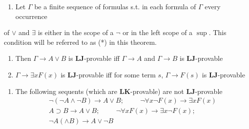 \documentclass[11pt]{article}
\def \LJ {\textbf{LJ}}
\def \LK {\textbf{LK}}
\begin{document}
\begin{theorem}[Harrop]
\label{orgf48515c}
\begin{enumerate}
\item Let \(\Gamma\) be a finite sequence of formulas s.t. in each formula of \(\Gamma\) every occurrence
\end{enumerate}
of \(\vee\) and \(\exists\) is either in the scope of a \(\neg\) or in the left scope of
a \(\sup\). This condition will be referred to as (*) in this theorem.
\begin{enumerate}
\item Then \(\Gamma\to A\vee B\) is \(\LJ\)-provable iff  \(\Gamma\to A\) and \(\Gamma\to B\) is \(\LJ\)-provable
\item \(\Gamma\to\exists xF(x)\) is \(\LJ\)-provable iff for some term \(s\), \(\Gamma\to F(s)\) is \(\LJ\)-provable
\end{enumerate}
\begin{enumerate}
\item The following sequents (which are \(\LK\)-provable) are not \(\LJ\)-provable
\begin{gather*}
\neg(\neg A\wedge\neg B)\to A\vee B;\hspace{1cm}
\neg\forall x\neg F(x)\to\exists xF(x)\\
A\supset B\to A\vee B;\hspace{1cm}
\neg\forall xF(x)\to\exists x\neg F(x);\\
\neg A(\wedge B)\to A\vee \neg B
\end{gather*}
\end{enumerate}
\end{theorem}
\end{document}
